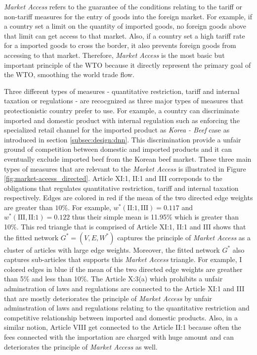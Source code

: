 \textit{Market Access} 
refers to the guarantee of the conditions relating to the 
tariff or non-tariff measures 
for the entry of 
goods into the foreign market. For example, if 
a country set a limit on the quantity of imported goods, no foreign goods above that limit can get access to that market. Also, if a country set a high tariff rate for a imported goods to cross the border, 
it also prevents foreign goods from accessing to that market.
Therefore, \textit{Market Access} is the most basic but important principle of the WTO
because it directly represent the primary goal of the WTO, smoothing the world trade flow.

Three different types of measures - quantitative restriction, tariff and internal taxation or regulations - are recocgnized as 
three major types of measures that protectionistic country prefer to use. For example, a country can
discriminate imported and domestic product with internal regulation such as enforcing the specialized retail channel for the imported product as \textit{Korea - Beef} case as introduced in section \ref{subsec:design:dnn}.
This discrimination provide a unfair ground of competition between domestic and imported products and it can eventually exclude imported beef from the Korean beef market.
These three main types of measures that are relevant to the \textit{Market Access} is illustrated in Figure \ref{fig:market-aceess_directed}.
Article XI:1, II:1 and III correponds to the obligations that regulates quantitative restriction, tariff and internal taxation respectively.
Edges are colored in red if the mean of the two directed edge weights are greater than $10\%$. For example, $w^*(\text{II:1}, \text{III}) = 0.117$ and $w^*(\text{III}, \text{II:1}) = 0.122$ thus their simple mean is 11.95\% which is greater than 10\%.
This red triangle that is comprised of Article XI:1, II:1 and III shows that the fitted network $G^* = (V, E, W^*)$ captures the principle of \textit{Market Access} as a cluster of articles with large edge weights. Moreover, 
the fitted network $G^*$ also captures sub-articles that supports this \textit{Market Access} triangle. For example, I colored edges in blue if the mean of the two directed edge weights are greather than 5\% and less than 10\%.
The Article X:3(a) which prohibits a unfair adminstration of laws and regulations are connected to the Article XI:1 and III that are mostly 
deteriorates the principle of \textit{Market Access} by unfair adminstration of laws and regulations relating to the quantitative restriction 
and competitive relationship between imported and domestic products. Also, in a similar notion, Article VIII get connected to the Article II:1 because 
often the fees connected with the importation are charged with huge amount and can deteriorates the principle of \textit{Market Access} as well.





